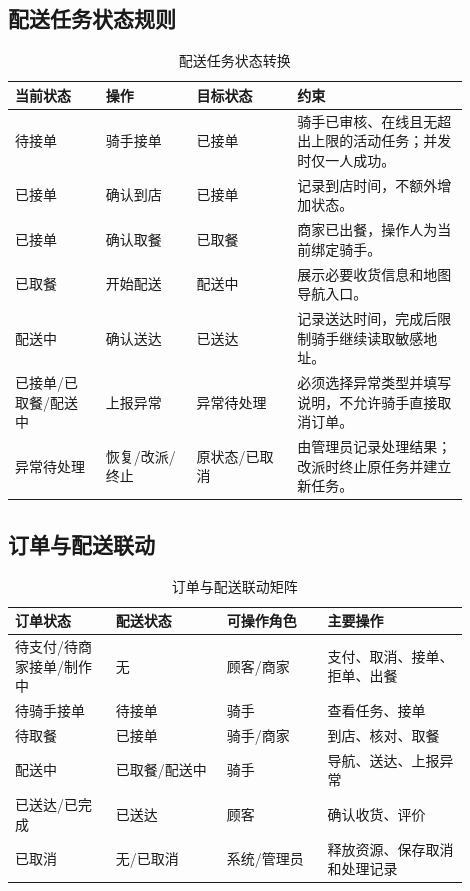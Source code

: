 \subsection{配送任务状态规则}


\begin{longtable}{|L{0.18\linewidth}|L{0.18\linewidth}|L{0.20\linewidth}|L{0.34\linewidth}|}
\caption{配送任务状态转换}\label{tab:delivery-state}\\ \hline
\textbf{当前状态} & \textbf{操作} & \textbf{目标状态} & \textbf{约束} \\ \hline
待接单 & 骑手接单 & 已接单 & 骑手已审核、在线且无超出上限的活动任务；并发时仅一人成功。 \\ \hline
已接单 & 确认到店 & 已接单 & 记录到店时间，不额外增加状态。 \\ \hline
已接单 & 确认取餐 & 已取餐 & 商家已出餐，操作人为当前绑定骑手。 \\ \hline
已取餐 & 开始配送 & 配送中 & 展示必要收货信息和地图导航入口。 \\ \hline
配送中 & 确认送达 & 已送达 & 记录送达时间，完成后限制骑手继续读取敏感地址。 \\ \hline
已接单/已取餐/配送中 & 上报异常 & 异常待处理 & 必须选择异常类型并填写说明，不允许骑手直接取消订单。 \\ \hline
异常待处理 & 恢复/改派/终止 & 原状态/已取消 & 由管理员记录处理结果；改派时终止原任务并建立新任务。 \\ \hline
\end{longtable}

\subsection{订单与配送联动}

\begin{longtable}{|L{0.20\linewidth}|L{0.22\linewidth}|L{0.20\linewidth}|L{0.28\linewidth}|}
\caption{订单与配送联动矩阵}\label{tab:order-delivery-map}\\ \hline
\textbf{订单状态} & \textbf{配送状态} & \textbf{可操作角色} & \textbf{主要操作} \\ \hline
待支付/待商家接单/制作中 & 无 & 顾客/商家 & 支付、取消、接单、拒单、出餐 \\ \hline
待骑手接单 & 待接单 & 骑手 & 查看任务、接单 \\ \hline
待取餐 & 已接单 & 骑手/商家 & 到店、核对、取餐 \\ \hline
配送中 & 已取餐/配送中 & 骑手 & 导航、送达、上报异常 \\ \hline
已送达/已完成 & 已送达 & 顾客 & 确认收货、评价 \\ \hline
已取消 & 无/已取消 & 系统/管理员 & 释放资源、保存取消和处理记录 \\ \hline
\end{longtable}

